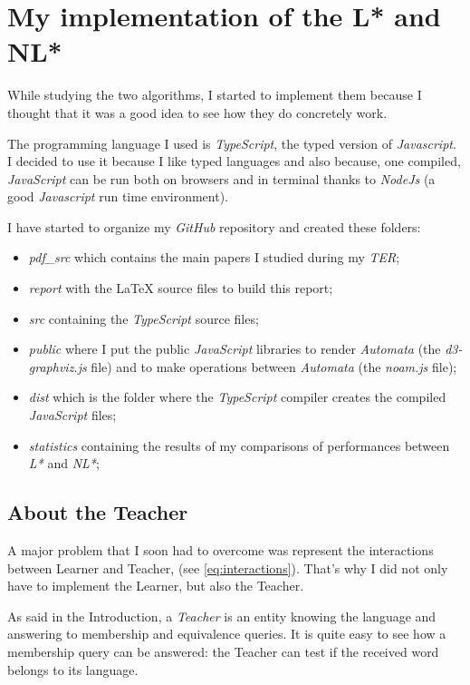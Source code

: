 \section{My implementation of the L* and NL*}
While studying the two algorithms, I started to implement them because I thought that it was a good idea to see how they do concretely work.

The programming language I used is \textit{TypeScript}, the typed version of \textit{Javascript}. I decided to use it because I like typed languages and also because, one compiled, \textit{JavaScript} can be run both on browsers and in terminal thanks to \textit{NodeJs} (a good \textit{Javascript} run time environment).

I have started to organize my \textit{GitHub} repository and created these folders:
\begin{itemize}
  \item \textit{pdf\_src} which contains the main papers I studied during my \textit{TER};
  \item \textit{report} with the \LaTeX{} source files to build this report;
  \item \textit{src} containing the \textit{TypeScript} source files;
  \item \textit{public} where I put the public \textit{JavaScript} libraries to render \textit{Automata} (the \textit{d3-graphviz.js} file) and to make operations between \textit{Automata} (the \textit{noam.js} file);
  \item \textit{dist} which is the folder where the \textit{TypeScript} compiler creates the compiled \textit{JavaScript} files;
  \item \textit{statistics} containing the results of my comparisons of performances between \textit{L*} and \textit{NL*};
\end{itemize}

\subsection{About the Teacher}

A major problem that I soon had to overcome was represent the interactions between Learner and Teacher, (see \cref{eq:interactions}). That's why  I did not only have to implement the Learner, but also the Teacher.

As said in the Introduction, a \textit{Teacher} is an entity knowing the language and answering to membership and equivalence queries. It is quite easy to see how a membership query can be answered: the Teacher can test if the received word belongs to its language.

